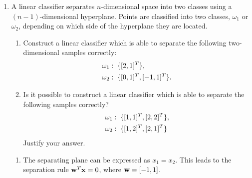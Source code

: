 \begin{enumerate}
\begin{solution}
  \end{solution}
  

\item A linear classifier separates $n$-dimensional
  space into two classes using a $(n-1)$-dimensional hyperplane. Points
  are classified into two classes, $\omega_1$ or $\omega_2$, depending on
  which side of the hyperplane they are located.
  \begin{enumerate} \item Construct a linear classifier which is able to
    separate the following two-dimensional samples correctly:\\
    \begin{align}
      &\omega_1: \text{\;} \{[2,1]^T\}, \notag \\
      &\omega_2: \text{\;} \{[0,1]^T, [-1,1]^T \}. \notag
    \end{align}
  \item Is it possible to construct a linear classifier which is able to
    separate the following samples correctly? \\
    \begin{align}
      &\omega_1:\text{\;} \{ [1,1]^T, [2,2]^T \}, \notag \\
      &\omega_2: \text{\;} \{ [1,2]^T,[2,1]^T \} \notag
    \end{align}
    Justify your answer.
  \end{enumerate}

  \begin{solution}


    \begin{enumerate} 
    \item

      The separating plane can be expressed as $x_1 = x_2$. This leads to
      the separation rule ${\bf{w}}^T {\bf{x}}=0$, where ${\bf{w}}=[-1,1]$.
      

\end{enumerate}
\end{solution}
\end{enumerate}
